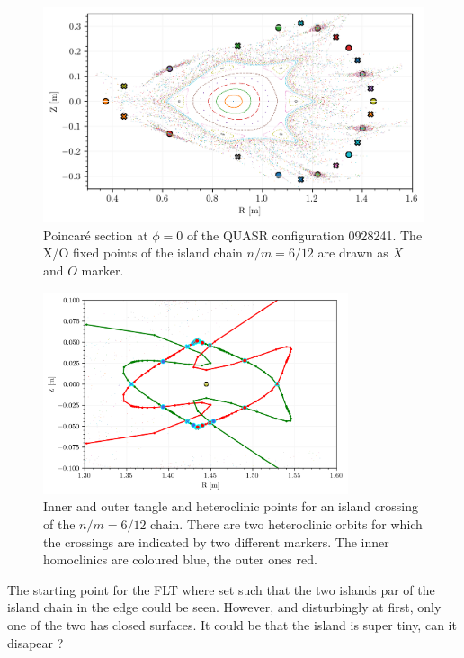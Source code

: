 \begin{figure}[H]
    \centering
    \includegraphics{images/quasrs/fixedpoint_ox_0928241.png}
    \caption{Poincaré section at $\phi=0$ of the QUASR configuration 0928241. The X/O fixed points of the island chain $n/m = 6/12$ are drawn as $X$ and $O$ marker.}
    \label{fig:p-0928241}
\end{figure}


\begin{figure}[H]
    \centering
    \includegraphics[width=0.8\textwidth]{images/quasrs/outer_0928241.png}
    \caption{Inner and outer tangle and heteroclinic points for an island crossing of the $n/m  = 6/12$ chain. There are two heteroclinic orbits for which the crossings are indicated by two different markers. The inner homoclinics are coloured blue, the outer ones red.}
    \label{fig:turn-0928241}
\end{figure}

The starting point for the FLT where set such that the two islands par of the island chain in the edge could be seen. However, and disturbingly at first, only one of the two has closed surfaces. It could be that the island is super tiny, can it disapear ? 

